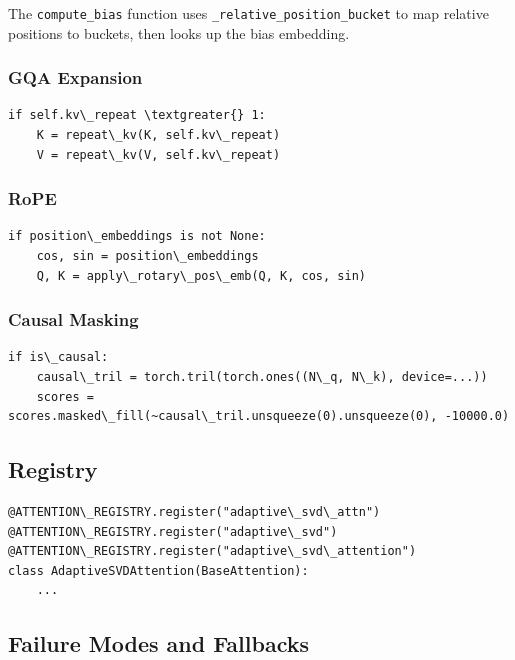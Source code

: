 The \texttt{compute\_bias} function uses \texttt{\_relative\_position\_bucket} to map relative 
positions to buckets, then looks up the bias embedding.

\subsubsection{GQA Expansion}

\begin{lstlisting}
if self.kv\_repeat \textgreater{} 1:
    K = repeat\_kv(K, self.kv\_repeat)
    V = repeat\_kv(V, self.kv\_repeat)
\end{lstlisting}

\subsubsection{RoPE}

\begin{lstlisting}
if position\_embeddings is not None:
    cos, sin = position\_embeddings
    Q, K = apply\_rotary\_pos\_emb(Q, K, cos, sin)
\end{lstlisting}

\subsubsection{Causal Masking}

\begin{lstlisting}
if is\_causal:
    causal\_tril = torch.tril(torch.ones((N\_q, N\_k), device=...))
    scores = scores.masked\_fill(~causal\_tril.unsqueeze(0).unsqueeze(0), -10000.0)
\end{lstlisting}

\subsection{Registry}

\begin{lstlisting}
@ATTENTION\_REGISTRY.register("adaptive\_svd\_attn")
@ATTENTION\_REGISTRY.register("adaptive\_svd")
@ATTENTION\_REGISTRY.register("adaptive\_svd\_attention")
class AdaptiveSVDAttention(BaseAttention):
    ...
\end{lstlisting}

\subsection{Failure Modes and Fallbacks}

